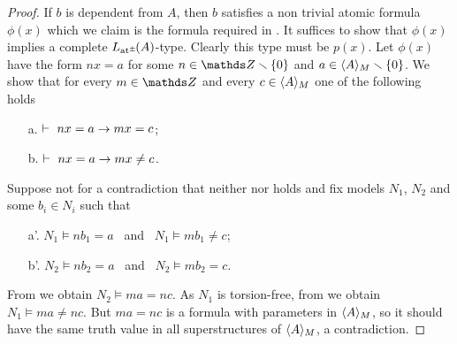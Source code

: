 \documentclass[creche.tex]{subfiles}
\begin{document}
\begin{proof}
If $b$ is dependent from $A$, then $b$ satisfies a non trivial atomic formula $\phi(x)$ which we claim is the formula required in . It suffices to show that $\phi(x)$ implies a complete $L_{{\tiny\rm at^\pm}}\hskip-.3ex(A)$-type. Clearly this type must be $p(x)$. Let $\phi(x)$ have the form $nx=a$ for some $n\in\ZZ\sm\{0\}$ and $a\in\langle A\rangle_M\smallsetminus\{0\}$. We show that for every $m\in\ZZ$ and every $c\in\langle A\rangle_M$ one of the following holds
\begin{itemize}
\item[a.] $\vdash\   nx=a\rightarrow mx=c$;
\item[b.] $\vdash\   nx=a\rightarrow mx\neq c$.
\end{itemize} 
Suppose not for a contradiction that neither  nor  holds and fix models $N_1$, $N_2$ and some $b_i\in N_i$ such that
\begin{itemize}
\item[a'.] $N_1\models nb_1=a$ \ and \ $N_1\models mb_1\neq c$;
\item[b'.] $N_2\models nb_2=a$ \ and \ $N_2\models mb_2 = c$.
\end{itemize} 
From  we obtain $N_2\models ma=nc$. As $N_1$ is torsion-free, from  we obtain $N_1\models ma\neq nc$. But $ma=nc$ is a formula with parameters in $\langle A\rangle_M$, so it should have the same truth value in all superstructures of $\langle A\rangle_M$, a contradiction.
\end{proof}






% 
% 
% 
\end{document}
